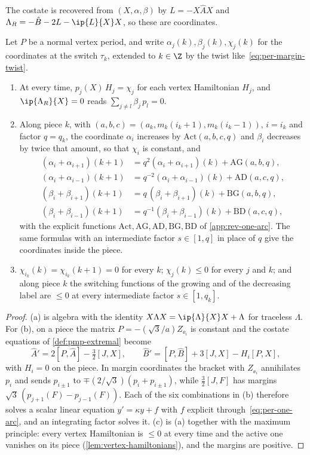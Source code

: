 The costate is recovered from $(X,\alpha,\beta)$ by $L=-X\hat AX$ and
$\Lambda_R=-\hat B-2L-\ip{L}{X}X$, so these are coordinates.

\begin{lemma}\label{lem:costate-transport}
Let $P$ be a normal vertex period, and write $\alpha_j(k),\beta_j(k),\chi_j(k)$ for the
coordinates at the switch $\tau_k$, extended to $k\in\Z$ by the twist like~\eqref{eq:per-margin-twist}.
\begin{enumerate}[label=\textup{(\alph*)}]
\item At every time, $p_j(X)\,H_j=\chi_j$ for each vertex Hamiltonian $H_j$, and
  $\ip{\Lambda_R}{X}=0$ reads $\sum_{j\ne l}\beta_j\,p_l=0$.
\item Along piece $k$, with $(a,b,c)=(a_k,m_k(i_k+1),m_k(i_k-1))$, $i=i_k$ and factor $q=q_k$,
  the coordinate $\alpha_i$ increases by $\mathrm{Act}(a,b,c,q)$ and $\beta_i$ decreases by twice
  that amount, so that $\chi_i$ is constant, and
  \[
    \begin{aligned}
    (\alpha_i+\alpha_{i+1})(k+1)&=q^2(\alpha_i+\alpha_{i+1})(k)+\mathrm{AG}(a,b,q),\\
    (\alpha_i+\alpha_{i-1})(k+1)&=q^{-2}(\alpha_i+\alpha_{i-1})(k)+\mathrm{AD}(a,c,q),\\
    (\beta_i+\beta_{i+1})(k+1)&=q\,(\beta_i+\beta_{i+1})(k)+\mathrm{BG}(a,b,q),\\
    (\beta_i+\beta_{i-1})(k+1)&=q^{-1}(\beta_i+\beta_{i-1})(k)+\mathrm{BD}(a,c,q),
    \end{aligned}
  \]
  with the explicit functions $\mathrm{Act},\mathrm{AG},\mathrm{AD},\mathrm{BG},\mathrm{BD}$ of
  \cref{app:rev-one-arc}. The same formulas with an intermediate factor $s\in[1,q]$ in place of
  $q$ give the coordinates inside the piece.
\item $\chi_{i_k}(k)=\chi_{i_k}(k+1)=0$ for every $k$; $\chi_j(k)\le0$ for every $j$ and $k$;
  and along piece $k$ the switching functions of the growing and of the decreasing label are
  $\le0$ at every intermediate factor $s\in[1,q_k]$.
\end{enumerate}
\end{lemma}

\begin{proof}
(a) is algebra with the identity $X\Lambda X=\ip{\Lambda}{X}X+\Lambda$ for traceless $\Lambda$. For (b), on a piece the matrix $P=-(\sqrt3/a)Z_{\ee_i}$ is constant
and the costate equations of \cref{def:pmp-extremal} become
\[
  \hat A'=2[P,\hat A]-\tfrac32[J,X],\qquad \hat B'=[P,\hat B]+3[J,X]-H_i[P,X],
\]
with $H_i=0$ on the piece. In margin coordinates the bracket with $Z_{\ee_i}$
annihilates $p_i$ and sends $p_{i\pm1}$ to $\mp(2/\sqrt3)(p_i+p_{i\pm1})$, while $\frac32[J,F]$
has margins $\sqrt3\,(p_{j+1}(F)-p_{j-1}(F))$. Each of the six combinations in (b) therefore solves a scalar
linear equation $y'=\kappa y+f$ with $f$ explicit through~\eqref{eq:per-one-arc}, and an integrating
factor solves it. (c) is (a) together with the maximum principle: every vertex
Hamiltonian is $\le0$ at every time and the active one vanishes on its piece
(\cref{lem:vertex-hamiltonians}), and the margins are positive.
\end{proof}

